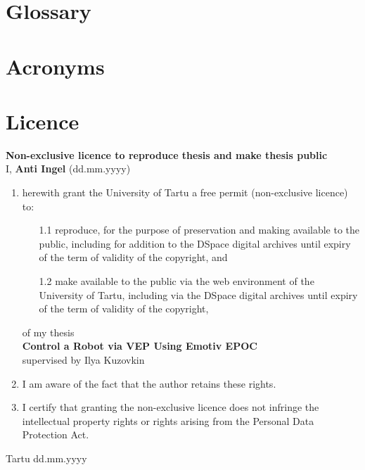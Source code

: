 
\begin{appendices}
\renewcommand{\thesection}{\Roman{section}}
\section{Glossary}
\printglossary
\newpage
\section{Acronyms}
\printglossary[type=\acronymtype]
\newpage
\section{Licence}
\textbf{Non-exclusive licence to reproduce thesis and make thesis public}\\[1cm]

\noindent I, \textbf{Anti Ingel} (dd.mm.yyyy)

\begin{enumerate}
	\item herewith grant the University of Tartu a free permit (non-exclusive licence) to:
	\begin{enumerate}
		\item[1.1] reproduce, for the purpose of preservation and making available to the public, including for addition to the DSpace digital archives until expiry of the term of validity of the copyright, and
		\item[1.2] make available to the public via the web environment of the University of Tartu, including via the DSpace digital archives until expiry of the term of validity of the copyright,
	\end{enumerate}
	of my thesis\\
	\textbf{Control a Robot via VEP Using Emotiv EPOC}\\
	supervised by Ilya Kuzovkin
	\item I am aware of the fact that the author retains these rights.
	\item I certify that granting the non-exclusive licence does not infringe the intellectual property rights or rights arising from the Personal Data Protection Act.
\end{enumerate}
\vspace{1cm}
Tartu dd.mm.yyyy


\end{appendices}